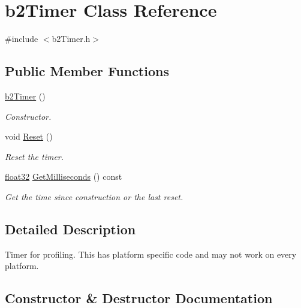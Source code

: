 \hypertarget{classb2_timer}{}\section{b2\+Timer Class Reference}
\label{classb2_timer}


{\ttfamily \#include $<$b2\+Timer.\+h$>$}

\subsection*{Public Member Functions}
\begin{DoxyCompactItemize}
\item 
\mbox{\hyperlink{classb2_timer_afcc159032a8edeaa9febdf2b6cbd49a5}{b2\+Timer}} ()
\begin{DoxyCompactList}\small\item\em Constructor. \end{DoxyCompactList}\item 
void \mbox{\hyperlink{classb2_timer_a367388794588e9283600437be82f2889}{Reset}} ()
\begin{DoxyCompactList}\small\item\em Reset the timer. \end{DoxyCompactList}\item 
\mbox{\hyperlink{b2_settings_8h_aacdc525d6f7bddb3ae95d5c311bd06a1}{float32}} \mbox{\hyperlink{classb2_timer_a15fd1aaa83a9d58cc004c852df71abb3}{Get\+Milliseconds}} () const
\begin{DoxyCompactList}\small\item\em Get the time since construction or the last reset. \end{DoxyCompactList}\end{DoxyCompactItemize}


\subsection{Detailed Description}
Timer for profiling. This has platform specific code and may not work on every platform. 

\subsection{Constructor \& Destructor Documentation}
\mbox{\label{classb2_timer_afcc159032a8edeaa9febdf2b6cbd49a5}} 
